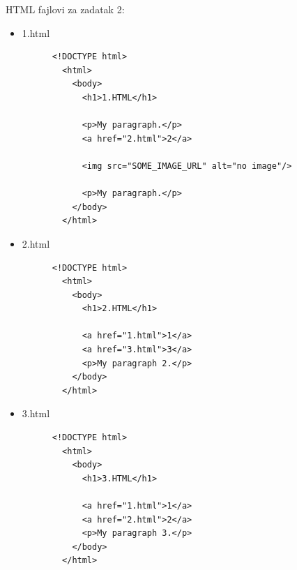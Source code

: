 \documentclass[]{article}
\begin{document}
\newpage

HTML fajlovi za zadatak 2:

\begin{itemize}
  \item 1.html
    \begin{lstlisting}
      <!DOCTYPE html>
        <html>
          <body>
            <h1>1.HTML</h1>

            <p>My paragraph.</p>
            <a href="2.html">2</a> 

            <img src="SOME_IMAGE_URL" alt="no image"/>

            <p>My paragraph.</p>
          </body>
        </html>
    \end{lstlisting}
  \item 2.html
    \begin{lstlisting}
      <!DOCTYPE html>
        <html>
          <body>
            <h1>2.HTML</h1>
  
            <a href="1.html">1</a> 
            <a href="3.html">3</a> 
            <p>My paragraph 2.</p>
          </body>
        </html>
    \end{lstlisting}
  \item 3.html
     \begin{lstlisting}
      <!DOCTYPE html>
        <html>
          <body>
            <h1>3.HTML</h1>
    
            <a href="1.html">1</a> 
            <a href="2.html">2</a> 
            <p>My paragraph 3.</p>
          </body>
        </html>
    \end{lstlisting}
\end{itemize}
\end{document}
